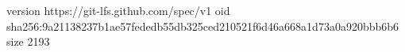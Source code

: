 version https://git-lfs.github.com/spec/v1
oid sha256:9a21138237b1ae57fededb55db325ced210521f6d46a668a1d73a0a920bbb6b6
size 2193
